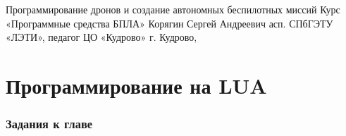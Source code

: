 \documentclass[
    fontsize=14pt, 
    DIV=12,
    headings=big,
    numbers=noenddot,
    toc=listof,      %
    toc=bib,         %
    headinclude=true,%
    footinclude=false
]{scrartcl}
\begin{document}
\makePioneerTitle
    {Программирование дронов и создание автономных беспилотных миссий}
    {Курс «Программные средства БПЛА»}
    {Корягин Сергей Андреевич}
    {асп. СПбГЭТУ «ЛЭТИ», педагог ЦО «Кудрово»}
    {г. Кудрово, \the\year}

\tableofcontents
\clearpage



\clearpage


\clearpage


\clearpage

\part{Программирование на LUA}








\clearpage

\section{Задания к главе}







\clearpage

















\clearpage
\end{document}

